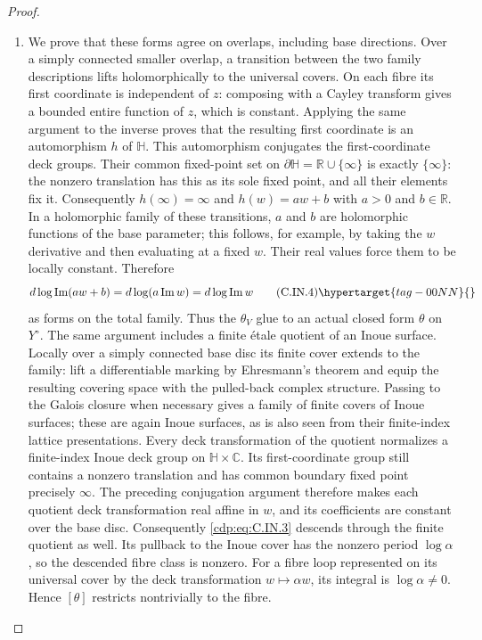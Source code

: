 \begin{proof}
\begin{enumerate}[label={$\langle1\rangle$\arabic*.},leftmargin=*]
\item We prove that these forms agree on overlaps, including base
directions. Over a simply connected smaller overlap, a transition
between the two family descriptions lifts holomorphically to the
universal covers. On each fibre its first coordinate is independent
of $z$: composing with a Cayley transform gives a bounded entire
function of $z$, which is constant. Applying the same argument to
the inverse proves that the resulting first coordinate is an
automorphism $h$ of $\mathbb H$. This automorphism conjugates the
first-coordinate deck groups. Their common fixed-point set on
$\partial\mathbb H=\mathbb R\cup\{\infty\}$ is exactly
$\{\infty\}$: the nonzero translation has this as its sole fixed
point, and all their elements fix it. Consequently $h(\infty)=
\infty$ and $h(w)=a w+b$ with $a>0$ and $b\in\mathbb R$.
In a holomorphic family of these transitions, $a$ and $b$ are
holomorphic functions of the base parameter; this follows, for
example, by taking the $w$ derivative and then evaluating at a
fixed $w$. Their real values force them to be locally constant.
Therefore
\[
 d\log\operatorname{Im}(a w+b)
 =d\log(a\operatorname{Im}w)
 =d\log\operatorname{Im}w
\tag{C.IN.4}\hypertarget{tag-00NN}{}\label{cdp:eq:C.IN.4}
\]
as forms on the total family. Thus the $\theta_V$ glue to an
actual closed form $\theta$ on $Y^\circ$.
The same argument includes a finite \'etale quotient of an Inoue
surface. Locally over a simply connected base disc its finite
cover extends to the family: lift a differentiable marking by
Ehresmann's theorem and equip the resulting covering space with
the pulled-back complex structure. Passing to the Galois closure
when necessary gives a family of finite covers of Inoue surfaces;
these are again Inoue surfaces, as is also seen from their
finite-index lattice presentations. Every deck transformation of
the quotient normalizes a finite-index Inoue deck group on
$\mathbb H\times\mathbb C$. Its first-coordinate group still
contains a nonzero translation and has common boundary fixed
point precisely $\infty$. The preceding conjugation argument
therefore makes each quotient deck transformation real affine in
$w$, and its coefficients are constant over the base disc.
Consequently \eqref{cdp:eq:C.IN.3} descends through the finite quotient as
well. Its pullback to the Inoue cover has the nonzero period
$\log\alpha$, so the descended fibre class is nonzero.
For a fibre loop represented on its universal cover by the deck
transformation $w\mapsto\alpha w$, its integral is
$\log\alpha\ne0$. Hence $[\theta]$ restricts nontrivially to
the fibre.


\end{enumerate}
\end{proof}
